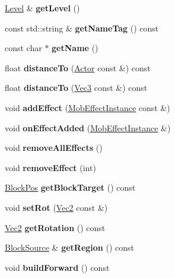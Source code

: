 \begin{DoxyCompactItemize}
\mbox{\hyperlink{struct_level}{Level}} \& {\bfseries get\+Level} ()
\item 
\mbox{\label{struct_actor_a674fd7e4d902f6ae345e801f3b72961c}} 
const std\+::string \& {\bfseries get\+Name\+Tag} () const
\item 
\mbox{\label{struct_actor_ab8435a1d0318ddc5e9a9c68f7754c8c4}} 
const char $\ast$ {\bfseries get\+Name} ()
\item 
\mbox{\label{struct_actor_af7cb2fcf402486ce353d3fd9f9de1c14}} 
float {\bfseries distance\+To} (\mbox{\hyperlink{struct_actor}{Actor}} const \&) const
\item 
\mbox{\label{struct_actor_aa53edf2bf61a587d8d79f01644f72fa8}} 
float {\bfseries distance\+To} (\mbox{\hyperlink{struct_vec3}{Vec3}} const \&) const
\item 
\mbox{\label{struct_actor_a6709ba4eae2256c7e1008a4d2e6761f7}} 
void {\bfseries add\+Effect} (\mbox{\hyperlink{struct_mob_effect_instance}{Mob\+Effect\+Instance}} const \&)
\item 
\mbox{\label{struct_actor_a930d306e9fa8775362989a8a50216471}} 
void {\bfseries on\+Effect\+Added} (\mbox{\hyperlink{struct_mob_effect_instance}{Mob\+Effect\+Instance}} \&)
\item 
\mbox{\label{struct_actor_ac02961a461411c12f2749352020187e9}} 
void {\bfseries remove\+All\+Effects} ()
\item 
\mbox{\label{struct_actor_a1b40cabe6737778e5c43d42c889f2e4c}} 
void {\bfseries remove\+Effect} (int)
\item 
\mbox{\label{struct_actor_a591daaf60e26651d7c1fe9bbfe18ff43}} 
\mbox{\hyperlink{struct_block_pos}{Block\+Pos}} {\bfseries get\+Block\+Target} () const
\item 
\mbox{\label{struct_actor_a00ecde3d0c92e56d11072002cf579734}} 
void {\bfseries set\+Rot} (\mbox{\hyperlink{struct_vec2}{Vec2}} const \&)
\item 
\mbox{\label{struct_actor_a65e2bc43e6bf4cac8c97f8e5d68146ab}} 
\mbox{\hyperlink{struct_vec2}{Vec2}} {\bfseries get\+Rotation} () const
\item 
\mbox{\label{struct_actor_a3bad72ee07c91eaf74808ac2506c5587}} 
\mbox{\hyperlink{struct_block_source}{Block\+Source}} \& {\bfseries get\+Region} () const
\item 
\mbox{\label{struct_actor_a263df76e5ebfcb3f321df610cfd3f503}} 
void {\bfseries build\+Forward} () const
\end{DoxyCompactItemize}
